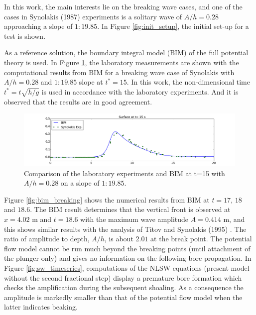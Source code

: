 \documentclass[review]{elsarticle}
\begin{document}
In this work, the main interests lie 
on the breaking wave cases, and 
one of the cases in Synolakis (1987) experiments is  
a solitary wave of $A/h=0.28$ approaching a slope of $1:19.85$.
In Figure \ref{fig:init_setup}, 
the initial set-up for a test is shown. 

As a reference solution, 
the boundary integral model (BIM) of the full potential theory is used.
In Figure \ref{fig:lab_bim}, the laboratory measurements
are shown with the computational results from BIM
for a breaking wave case of Synolakis with $A/h=0.28$ and $1:19.85$ slope
at $t^*=15$. In this work, the non-dimensional time 
$t^*=t\sqrt{h/g}$ is used 
in accordance with the laboratory experiments.
And it is observed that the results are in good agreement. 

\begin{figure}[!htb]
\centering
\includegraphics[width=\textwidth]{_fig/lab_bim_t15.png}
\caption{Comparison of the laboratory experiments and BIM at t=15 with $A/h=0.28$ 
on a slope of $1:19.85$.}
\label{fig:lab_bim}
\end{figure}

Figure \ref{fig:bim_breaking} shows
the numerical results from BIM at $t=17$, $18$ and  $18.6$.
The BIM result determines that 
the vertical front is observed at $x=4.02$ m and $t=18.6$
with the maximum wave amplitude $A=0.414$ m,
and this shows similar results with 
the analysis of Titov and Synolakis (1995) \cite{titov1995modeling}. 
The ratio of amplitude to depth, $A/h$, 
is about $2.01$ at the break point.
The potential flow model cannot be run much beyond the
breaking points (until attachment of the plunger only) and 
gives no information on the following  bore propagation.
In Figure \ref{fig:sw_timeseries}, 
computations of the NLSW equations (present model without the second 
fractional step) display a premature bore formation which checks the
amplification during the subsequent shoaling. 
As a consequence the amplitude is markedly smaller than that of the 
potential flow model when the latter indicates beaking.
\end{document}
